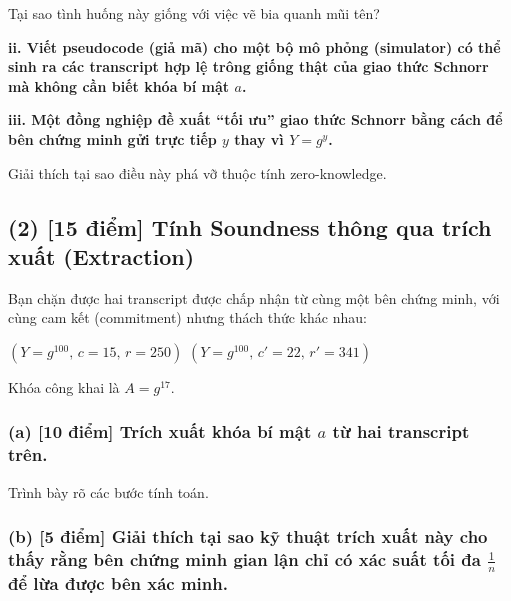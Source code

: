 Tại sao tình huống này giống với việc vẽ bia quanh mũi tên?

\textbf{ii. Viết pseudocode (giả mã) cho một bộ mô phỏng (simulator) có thể sinh ra các transcript hợp lệ trông giống thật của giao thức Schnorr mà không cần biết khóa bí mật $a$.}

\textbf{iii. Một đồng nghiệp đề xuất ``tối ưu'' giao thức Schnorr bằng cách để bên chứng minh gửi trực tiếp $y$ thay vì $Y = g^y$.}

Giải thích tại sao điều này phá vỡ thuộc tính zero-knowledge.

\vspace{0.5cm}

\subsection{(2) [15 điểm] Tính Soundness thông qua trích xuất (Extraction)}

Bạn chặn được hai transcript được chấp nhận từ cùng một bên chứng minh, với cùng cam kết (commitment) nhưng thách thức khác nhau:

$(Y = g^{100},\, c = 15,\, r = 250)$
\quad{}\quad
$(Y = g^{100},\, c' = 22,\, r' = 341)$

Khóa công khai là $A = g^{17}$.

\subsubsection{(a) [10 điểm] Trích xuất khóa bí mật $a$ từ hai transcript trên.}

Trình bày rõ các bước tính toán.

\subsubsection{(b) [5 điểm] Giải thích tại sao kỹ thuật trích xuất này cho thấy rằng bên chứng minh gian lận chỉ có xác suất tối đa $\frac{1}{n}$ để lừa được bên xác minh.}
